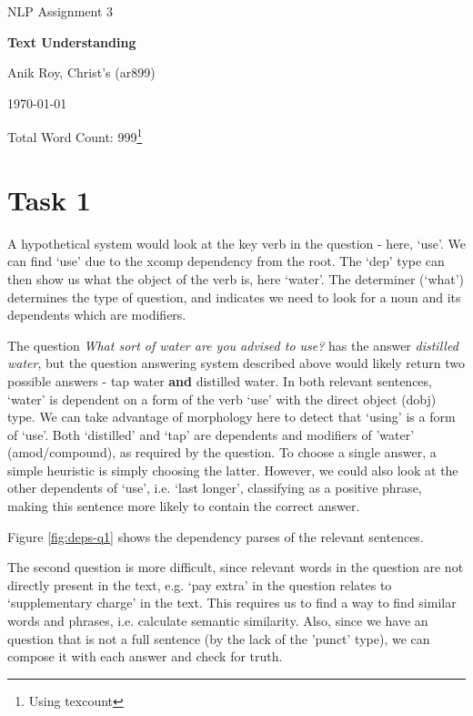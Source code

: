\documentclass[12pt,a4paper]{article}
\begin{document}
\centerline{\large NLP Assignment 3}
\vspace{0.2in}
\centerline{\Large\bf Text Understanding}
\vspace{0.1in}
\centerline{\large {Anik Roy, Christ's (ar899)}}
\vspace{0.1in}
\centerline{\large {\today}}
\vspace{0.05in}
\centerline{Total Word Count: 999\footnote{Using texcount}}
\vspace{0.2in}



\section*{Task 1}


A hypothetical system would look at the key verb in the question - here, `use'. We can find `use' due to the xcomp dependency from the root. The `dep' type can then show us what the object of the verb is, here `water'. The determiner (`what') determines the type of question, and indicates we need to look for a noun and its dependents which are modifiers.

The question \textit{What sort of water are you advised to use?} has the answer \textit{distilled water}, but the question answering system described above would likely return two possible answers - tap water \textbf{and} distilled water. In both relevant sentences, `water' is dependent on a form of the verb `use' with the direct object (dobj) type. We can take advantage of morphology \cite{} here to detect that `using' is a form of `use'. Both `distilled' and `tap' are dependents and modifiers of 'water' (amod/compound), as required by the question. To choose a single answer, a simple heuristic is simply choosing the latter. However, we could also look at the other dependents of `use', i.e. `last longer', classifying as a positive phrase, making this sentence more likely to contain the correct answer. 


Figure \ref{fig:deps-q1} shows the dependency parses of the relevant sentences.


The second question is more difficult, since relevant words in the question are not directly present in the text, e.g. `pay extra' in the question relates to `supplementary charge' in the text. This requires us to find a way to find similar words and phrases, i.e. calculate semantic similarity. Also, since we have an question that is not a full sentence (by the lack of the 'punct' type), we can compose it with each answer and check for truth.
\end{document}
